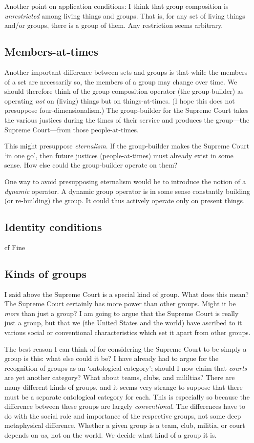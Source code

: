\documentclass[11pt]{article}
\begin{document}
\begin{spacing}{1.25}
Another point on application conditions: I think that group
composition is {\em unrestricted} among living things and groups.
That is, for any set of living things and/or groups, there is a group
of them.  Any restriction seems arbitrary.

\subsection{Members-at-times}
Another important difference between sets and groups is that while the
members of a set are necessarily so, the members of a group may change
over time.  We should therefore think of the group composition
operator (the group-builder) as operating {\em not} on (living) things
but on things-at-times.  (I hope this does not presuppose
four-dimensionalism.)  The group-builder for the Supreme Court takes
the various justices during the times of their service and produces
the group---the Supreme Court---from those people-at-times.

This might presuppose {\em eternalism}.  If the group-builder makes
the Supreme Court `in one go', then future justices (people-at-times)
must already exist in some sense.  How else could the group-builder
operate on them?

One way to avoid presupposing eternalism would be to introduce the
notion of a {\em dynamic} operator.  A dynamic group operator is in
some sense constantly building (or re-building) the group.  It could
thus actively operate only on present things.

\subsection{Identity conditions}
cf Fine

\subsection{Kinds of groups}
I said above the Supreme Court is a special kind of group.  What does
this mean?  The Supreme Court certainly has more power than other
groups.  Might it be {\em more} than just a group?  I am going to
argue that the Supreme Court is really just a group, but that we (the
United States and the world) have ascribed to it various social or
conventional characteristics which set it apart from other groups.

The best reason I can think of for considering the Supreme Court to be
simply a group is this: what else could it be?  I have already had to
argue for the recognition of groups as an `ontological category';
should I now claim that {\em courts} are yet another category?  What
about teams, clubs, and mililtias?  There are many different kinds of
groups, and it seems very strange to suppose that there must be a
separate ontological category for each.  This is especially so because
the difference between these groups are largely {\em conventional}.
The differences have to do with the social role and importance of the
respective groups, not some deep metaphysical difference.  Whether a
given group is a team, club, militia, or court depends on {\em us},
not on the world.  We decide what kind of a group it is.


\end{spacing}
\end{document}
